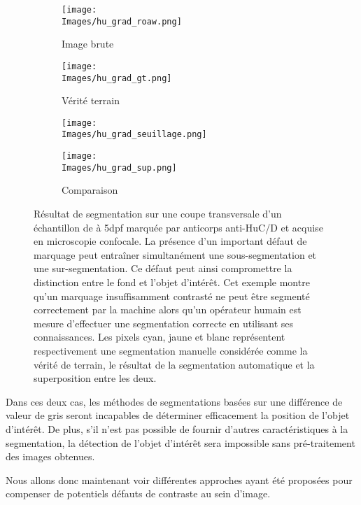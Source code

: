 \documentclass[\main/main.tex]{subfiles}
\providecommand{\Images}{\main/Figures/intro_seg}
\begin{document}
\begin{figure}[h]
\begin{center}
    \begin{subfigure}[b]{0.2245\textwidth}
        \caption{
        Image brute
            }
       \centering \texttt{[image: \\Images/hu\_grad\_roaw.png]}
    \end{subfigure}
    \begin{subfigure}[b]{0.2245\textwidth}
        \caption{
        Vérité terrain
            }
       \centering \texttt{[image: \\Images/hu\_grad\_gt.png]}
    \end{subfigure}
    \begin{subfigure}[b]{0.2245\textwidth}
        \caption{
            }
       \centering \texttt{[image: \\Images/hu\_grad\_seuillage.png]}
    \end{subfigure}
    \begin{subfigure}[b]{0.2245\textwidth}
        \caption{
            Comparaison
            }
       \centering \texttt{[image: \\Images/hu\_grad\_sup.png]}
    \end{subfigure}
    \caption{
    \label{apriori:grad}
        Résultat de segmentation sur une coupe transversale d'un échantillon de \pz{} à 5dpf marquée par anticorps anti\hyp{}HuC/D et acquise en microscopie confocale.
        \newline
        La présence d'un important défaut de marquage peut entraîner simultanément une sous-segmentation et une sur\hyp{}segmentation. Ce défaut peut ainsi compromettre la distinction entre le fond et l'objet d'intérêt.
        Cet exemple montre qu'un marquage insuffisamment contrasté ne peut être segmenté correctement par la machine alors qu'un opérateur humain est mesure d'effectuer une segmentation correcte en utilisant ses connaissances.
        \newline
        Les pixels cyan, jaune et blanc représentent respectivement une segmentation manuelle considérée comme la vérité de terrain,
        le résultat de la segmentation automatique et la superposition entre les deux.
    }
\end{center}
\end{figure}

Dans ces deux cas, les méthodes de segmentations basées sur une différence de valeur de gris seront incapables de déterminer efficacement la position de l'objet d'intérêt.
%
De plus, s'il n'est pas possible de fournir d'autres caractéristiques à la segmentation, la détection de l'objet d'intérêt sera impossible sans pré\hyp{}traitement des images obtenues.

%
Nous allons donc maintenant voir différentes approches ayant été proposées pour compenser de potentiels défauts de contraste au sein d'image.
\end{document}
